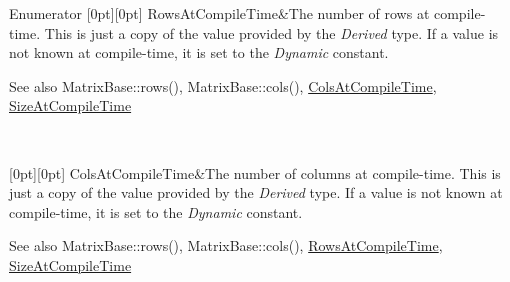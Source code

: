 \begin{DoxyEnumFields}{Enumerator}
[0pt][0pt]{}\mbox{\label{class_eigen_1_1_skyline_matrix_base_a811ba3961cb927ae5fa84ed278ebceeaa22b71b821112b0ccf61b7317b9ac4cf4}} 
Rows\+At\+Compile\+Time&The number of rows at compile-\/time. This is just a copy of the value provided by the {\itshape Derived} type. If a value is not known at compile-\/time, it is set to the {\itshape Dynamic} constant. \begin{DoxySeeAlso}{See also}
Matrix\+Base\+::rows(), Matrix\+Base\+::cols(), \hyperlink{class_eigen_1_1_skyline_matrix_base_a811ba3961cb927ae5fa84ed278ebceeaa0bb8b9ae248b86ca53aff754311111e8}{Cols\+At\+Compile\+Time}, \hyperlink{class_eigen_1_1_skyline_matrix_base_a811ba3961cb927ae5fa84ed278ebceeaacd91cb554fe479f85ab5749902d89217}{Size\+At\+Compile\+Time} 
\end{DoxySeeAlso}
\\
\hline

[0pt][0pt]{}\mbox{\label{class_eigen_1_1_skyline_matrix_base_a811ba3961cb927ae5fa84ed278ebceeaa0bb8b9ae248b86ca53aff754311111e8}} 
Cols\+At\+Compile\+Time&The number of columns at compile-\/time. This is just a copy of the value provided by the {\itshape Derived} type. If a value is not known at compile-\/time, it is set to the {\itshape Dynamic} constant. \begin{DoxySeeAlso}{See also}
Matrix\+Base\+::rows(), Matrix\+Base\+::cols(), \hyperlink{class_eigen_1_1_skyline_matrix_base_a811ba3961cb927ae5fa84ed278ebceeaa22b71b821112b0ccf61b7317b9ac4cf4}{Rows\+At\+Compile\+Time}, \hyperlink{class_eigen_1_1_skyline_matrix_base_a811ba3961cb927ae5fa84ed278ebceeaacd91cb554fe479f85ab5749902d89217}{Size\+At\+Compile\+Time} 
\end{DoxySeeAlso}
\\
\hline


\end{DoxyEnumFields}
